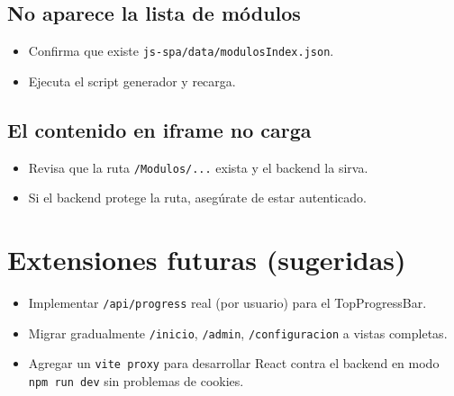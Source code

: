 \documentclass[12pt,a4paper]{article}
\begin{document}
\subsection{No aparece la lista de m\'odulos}
\begin{itemize}[leftmargin=*]
  \item Confirma que existe \texttt{js-spa/data/modulosIndex.json}.
  \item Ejecuta el script generador y recarga.
\end{itemize}

\subsection{El contenido en iframe no carga}
\begin{itemize}[leftmargin=*]
  \item Revisa que la ruta \texttt{/Modulos/...} exista y el backend la sirva.
  \item Si el backend protege la ruta, aseg\'urate de estar autenticado.
\end{itemize}

\section{Extensiones futuras (sugeridas)}
\begin{itemize}[leftmargin=*]
  \item Implementar \texttt{/api/progress} real (por usuario) para el TopProgressBar.
  \item Migrar gradualmente \texttt{/inicio}, \texttt{/admin}, \texttt{/configuracion} a vistas completas.
  \item Agregar un \texttt{vite proxy} para desarrollar React contra el backend en modo \texttt{npm run dev} sin problemas de cookies.
\end{itemize}
\end{document}
